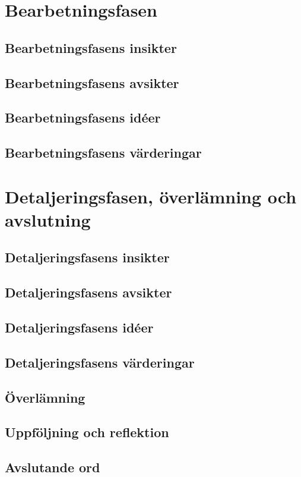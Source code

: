\documentclass[12pt,a4paper]{article}
\begin{document}
\section{Bearbetningsfasen}
\subsection{Bearbetningsfasens insikter}
\subsection{Bearbetningsfasens avsikter}
\subsection{Bearbetningsfasens idéer}
\subsection{Bearbetningsfasens värderingar}

\section{Detaljeringsfasen, överlämning och avslutning}
\subsection{Detaljeringsfasens insikter}
\subsection{Detaljeringsfasens avsikter}
\subsection{Detaljeringsfasens idéer}
\subsection{Detaljeringsfasens värderingar}
\subsection{Överlämning}
\subsection{Uppföljning och reflektion}
\subsection{Avslutande ord}

\fi
\end{document}
